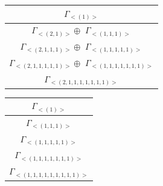 \begin{minipage}{.5\textwidth}
\centering
\begin{tabular}{|c|}\hline
$\Gamma_{<(
1
)>}$
\\ \hline
$\Gamma_{<(
2 , 
1
)>} \oplus$
$\Gamma_{<(
1 , 
1 , 
1
)>}$
\\ \hline
$\Gamma_{<(
2 , 
1 , 
1 , 
1
)>} \oplus$
$\Gamma_{<(
1 , 
1 , 
1 , 
1 , 
1
)>}$
\\ \hline
$\Gamma_{<(
2 , 
1 , 
1 , 
1 , 
1 , 
1
)>} \oplus$
$\Gamma_{<(
1 , 
1 , 
1 , 
1 , 
1 , 
1 , 
1
)>}$
\\ \hline
$\Gamma_{<(
2 , 
1 , 
1 , 
1 , 
1 , 
1 , 
1 , 
1
)>}$
\\
\hline\end{tabular}\end{minipage}
\bigskip
\begin{minipage}{1\textwidth}
\centering
\begin{tabular}{|c|}\hline
$\Gamma_{<(
1
)>}$
\\ \hline
$\Gamma_{<(
1 , 
1 , 
1
)>}$
\\ \hline
$\Gamma_{<(
1 , 
1 , 
1 , 
1 , 
1
)>}$
\\ \hline
$\Gamma_{<(
1 , 
1 , 
1 , 
1 , 
1 , 
1 , 
1
)>}$
\\ \hline
$\Gamma_{<(
1 , 
1 , 
1 , 
1 , 
1 , 
1 , 
1 , 
1 , 
1
)>}$
\\
\hline\end{tabular}\end{minipage}
\\




